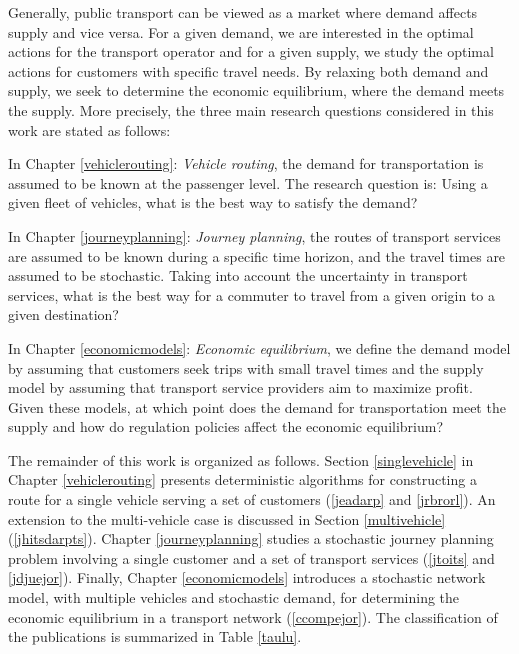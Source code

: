 \documentclass[dissertation,draft*]{aaltoseries}
\begin{document}
Generally, public transport can be viewed as a market where demand affects supply and vice versa.
For a given demand, we are interested in the optimal actions for the transport operator and for a given supply, 
we study the optimal actions for customers with specific travel needs. By relaxing both demand and supply, 
we seek to determine the economic equilibrium, where the demand meets the supply.
More precisely, the three main research questions considered in this work are stated as follows: 

In Chapter \ref{vehiclerouting}: \emph{Vehicle routing}, the demand for transportation is assumed to be known at the passenger level. 
The research question is: Using a given fleet of vehicles, what is the best way to satisfy the demand? 

In Chapter \ref{journeyplanning}: \emph{Journey planning}, the routes of transport services are assumed to be known during a specific time horizon,
and the travel times are assumed to be stochastic.
Taking into account the uncertainty in transport services, what is the best way for a commuter to travel from a given origin to a given destination?

In Chapter \ref{economicmodels}: \emph{Economic equilibrium}, we define the demand model by assuming that customers seek trips with
small travel times and the supply model by assuming that transport service providers aim to maximize profit. Given these models,
at which point does the demand for transportation meet the supply and how do regulation policies affect the economic equilibrium?




The remainder of this work is organized as follows.
Section \ref{singlevehicle} in Chapter \ref{vehiclerouting} presents deterministic algorithms for constructing a route for a 
single vehicle serving a set of customers (\ref{jeadarp} and \ref{jrbrorl}). 
An extension to the multi-vehicle case is discussed in Section \ref{multivehicle} (\ref{jhitsdarpts}). 
Chapter \ref{journeyplanning} studies a stochastic
journey planning problem involving a single customer and a set of transport services (\ref{jtoits} and \ref{jdjuejor}). 
Finally, Chapter \ref{economicmodels} introduces a 
stochastic network model, with multiple vehicles and stochastic demand, for determining the economic equilibrium in a transport network (\ref{ccompejor}). 
The classification of the publications is summarized in Table \ref{taulu}. 
\end{document}
